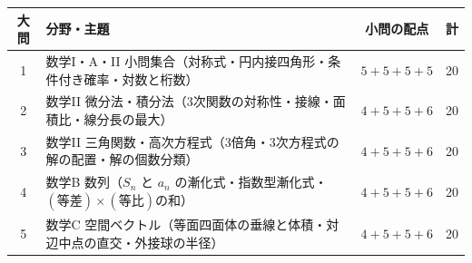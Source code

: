 \begin{center}\small
\begin{tabular}{@{}clcr@{}}
\toprule
\textbf{大問} & \textbf{分野・主題} & \textbf{小問の配点} & \textbf{計} \\
\midrule
1 & 数学I・A・II 小問集合（対称式・円内接四角形・条件付き確率・対数と桁数） & $5+5+5+5$ & 20 \\
2 & 数学II 微分法・積分法（3次関数の対称性・接線・面積比・線分長の最大） & $4+5+5+6$ & 20 \\
3 & 数学II 三角関数・高次方程式（3倍角・3次方程式の解の配置・解の個数分類） & $4+5+5+6$ & 20 \\
4 & 数学B 数列（$S_{n}$ と $a_{n}$ の漸化式・指数型漸化式・$(等差)\times(等比)$の和） & $4+5+5+6$ & 20 \\
5 & 数学C 空間ベクトル（等面四面体の垂線と体積・対辺中点の直交・外接球の半径） & $4+5+5+6$ & 20 \\
\bottomrule
\end{tabular}
\end{center}

